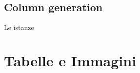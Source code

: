 \documentclass{article}
\begin{document}
\subsection{Column generation}
Le istanze 


\clearpage
\newpage
{} 
\section{Tabelle e Immagini}
\label{appendice}
\end{document}
